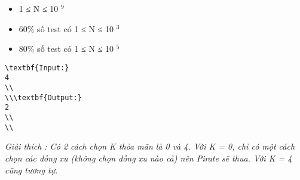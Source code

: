 \begin{itemize}
	\item     1 ≤ N ≤ 10    $^     9    $
	\item     60\% số test có 1 ≤ N ≤ 10    $^     3    $
	\item     80\% số test có 1 ≤ N ≤ 10    $^     5    $
\end{itemize}
\begin{verbatim}
\textbf{Input:}
4
\\
\\\textbf{Output:}
2
\\
\\\end{verbatim}

\emph{     Giải thích        : Có 2 cách chọn K thỏa mãn là 0 và 4. Với K = 0, chỉ có một cách chọn các đồng xu (không chọn đồng xu nào cả) nên Pirate sẽ thua. Với K = 4 cũng tương tự.    
\\}